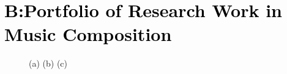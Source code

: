 \documentclass{TMLSStyleGuideResumeVitae}
\begin{document}
\section{\textcolor{black}{B:Portfolio of Research Work in Music Composition}}
\begin{figure}[h]
\centering
\begin{minipage}[b]{0.3\linewidth}
\end{minipage}\hfill
\begin{minipage}[b]{0.3\linewidth}
\end{minipage}\hfill	
\begin{minipage}[b]{0.3\linewidth}
\end{minipage}\hfill
\caption{(a) (b) (c) }
\label{fig:Figure1}
\end{figure} 

\newpage
\end{document}
